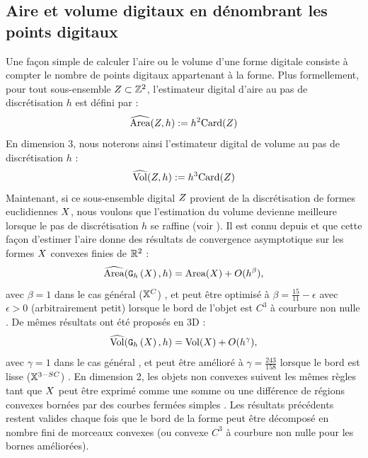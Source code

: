 \subsection{Aire et volume digitaux en dénombrant les points digitaux}
\label{sec:AreaByCounting}
%
Une façon simple de calculer l'aire ou le volume d'une forme digitale consiste à
compter le nombre de points digitaux appartenant à la forme. Plus formellement,
pour tout sous-ensemble $Z \subset \mathbb{Z}^2$, l'estimateur digital d'aire au pas
de discrétisation $h$ est défini par :
%
\begin{equation}
  \widehat{\mathrm{Area}}(Z, h) := h^2 \mathrm{Card}(Z)
\end{equation}
%
En dimension $3$, nous noterons ainsi l'estimateur digital de volume au pas de
discrétisation $h$ :
%
\begin{equation}
  \widehat{\mathrm{Vol}}(Z, h) := h^3 \mathrm{Card}(Z)
\end{equation}
%
Maintenant, si ce sous-ensemble digital $Z$ provient de la discrétisation de
formes euclidiennes $X$, nous voulons que l'estimation du volume devienne
meilleure lorsque le pas de discrétisation $h$ se raffine (voir
). Il est connu depuis
 et  que cette façon d'estimer l'aire donne
des résultats de convergence asymptotique sur les formes $X$ convexes
finies de $\mathbb{R}^2$ :
%
\begin{equation}
  \label{eq:AreaByCountingConv}
  \widehat{\mathrm{Area}}(\mathtt{G}_{h}\left(X\right),h) = \mathrm{Area}(X) + O(h^\beta),
\end{equation}
%
avec $\beta = 1$ dans le cas général ($\mathbb{X}^{C}$) \cite{Klette2000}, et peut être optimisé à
$\beta = \frac{15}{11} - \epsilon$ avec $\epsilon > 0$ (arbitrairement petit)
lorsque le bord de l'objet est $C^3$ à courbure non nulle \cite{Huxley1990}.
De mêmes résultats ont été proposés en 3D :
%
\begin{equation}
  \label{eq:VolumeByCountingConv}
  \widehat{\mathrm{Vol}}(\mathtt{G}_{h}\left(X\right),h) = \mathrm{Vol}(X) + O(h^\gamma),
\end{equation}
%
avec $\gamma = 1$ dans le cas général \cite{Kratzel1988}, et peut être amélioré à
$\gamma=\frac{243}{158}$ lorsque le bord est lisse ($\mathbb{X}^{3-SC}$) \cite{Guo2010}.
%
En dimension 2, les objets non convexes suivent les mêmes règles tant que
$X$ peut être exprimé comme une somme ou une différence de régions convexes
bornées par des courbes fermées simples \cite{Huxley1996}. Les résultats
précédents restent valides chaque fois que le bord de la forme peut être
décomposé en nombre fini de morceaux convexes (ou convexe $C^3$ à courbure non
nulle pour les bornes améliorées).
%
